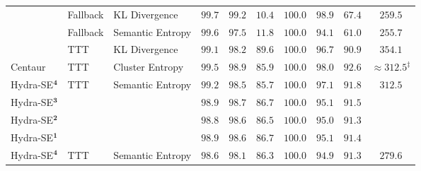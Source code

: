 \begin{table}[tbp]
\begin{adjustbox}{max width=\textwidth}
\begin{tabular}{l|ll|rrrr|rr|c}
    & Fallback & KL Divergence & $99.7$ & $99.2$ & $10.4$ & $100.0$ & $98.9$ & $67.4$ & $259.5$ \\
    & Fallback & Semantic Entropy & $99.6$ & $97.5$ & $11.8$ & $100.0$ & $94.1$ & $61.0$ & $255.7$ \\
    & TTT & KL Divergence & $99.1$ & $98.2$ & $89.6$ & $100.0$ & $96.7$ & $90.9$ & $354.1$ \\
    \midrule
    Centaur & TTT & Cluster Entropy & $99.5$ & $98.9$ & $85.9$ & $100.0$ & $98.0$ & $92.6$ & $\approx 312.5^{\ddagger}$ \\
    \midrule
    Hydra-SE$^{\mathbf{4}}$ & \multirow{4}{*}{TTT} & \multirow{4}{*}{Semantic Entropy} & $99.2$ & $98.5$ & $85.7$ & $100.0$ & $97.1$ & $91.8$ & \multirow{4}{*}{$312.5$} \\
    Hydra-SE$^{\mathbf{3}}$ & & & $98.9$ & $98.7$ & $86.7$ & $100.0$ & $95.1$ & $91.5$ & \\
    Hydra-SE$^{\mathbf{2}}$ & & & $98.8$ & $98.6$ & $86.5$ & $100.0$ & $95.0$ & $91.3$ & \\
    Hydra-SE$^{\mathbf{1}}$ & & & $98.9$ & $98.6$ & $86.7$ & $100.0$ & $95.1$ & $91.4$ & \\
    \midrule
    \rowcolor{gray!50} Hydra-SE$^{\mathbf{4}}$ & TTT & Semantic Entropy & $98.6$ & $98.1$ & $86.3$ & $100.0$ & $94.9$ & $91.3$ & $279.6$ \\
    \bottomrule
  \end{tabular}
  \end{adjustbox}
\end{table}

